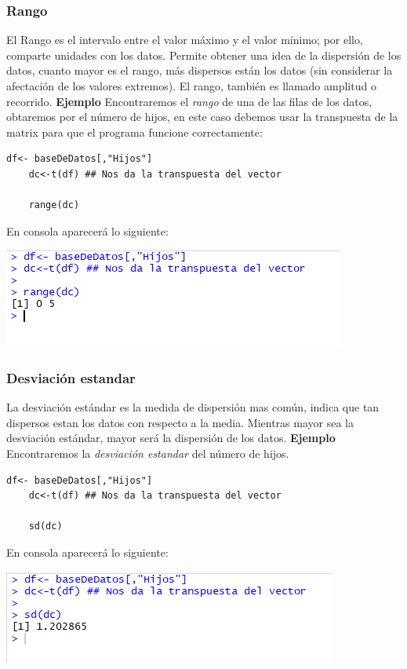 \documentclass[12pt,hidelinks]{article}
\begin{document}
	\subsubsection{Rango}
	El Rango es el intervalo entre el valor máximo y el valor mínimo; por ello, comparte unidades con los datos. Permite obtener una idea de la dispersión de los datos, cuanto mayor es el rango, más dispersos están los datos (sin considerar la afectación de los valores extremos). El rango, también es llamado amplitud o recorrido. \textbf{Ejemplo} Encontraremos el \textit{rango} de una de las filas de los datos, obtaremos por el número de hijos, en este caso debemos usar la transpuesta de la matrix para que el programa funcione correctamente:
	\begin{lstlisting}[frame=single]
	df<- baseDeDatos[,"Hijos"]
	dc<-t(df) ## Nos da la transpuesta del vector
	
	range(dc)
	\end{lstlisting}
	En consola aparecerá lo siguiente:
	\begin{center}
		\includegraphics[]{images/2/Rango.PNG}
	\end{center}
	\subsubsection{Desviación estandar}
	La desviación estándar es la medida de dispersión mas común, indica que tan dispersos estan los datos con respecto a la media. Mientras mayor sea la desviación estándar, mayor será la dispersión de los datos. \textbf{Ejemplo} Encontraremos la \textit{desviación estandar} del número de hijos.
	\begin{lstlisting}[frame=single]
	df<- baseDeDatos[,"Hijos"]
	dc<-t(df) ## Nos da la transpuesta del vector
	
	sd(dc)
	\end{lstlisting}
	En consola aparecerá lo siguiente:
	\begin{center}
		\includegraphics[]{images/2/Desviacion_estandar.PNG}
	\end{center}
\end{document}
